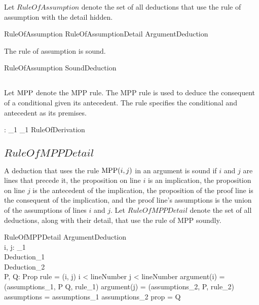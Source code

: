 \documentclass[11pt, oneside]{article}
\begin{document}
Let $RuleOfAssumption$ denote the set of all deductions that use the rule of assumption with the detail hidden.

\begin{zed}
	RuleOfAssumption  RuleOfAssumptionDetail \project ArgumentDeduction
\end{zed}

The rule of assumption is sound.

\begin{zed}
	RuleOfAssumption \subset SoundDeduction
\end{zed}

\subsection{}

Let $\operatorname{MPP}$ denote the MPP rule.
The MPP rule is used to deduce the consequent of a conditional given its antecedent.
The rule specifies the conditional and antecedent as its premises.

\begin{axdef}
	: \nat_1 \cross \nat_1 \fun RuleOfDerivation
\end{axdef}

\subsection{$RuleOfMPPDetail$}

A deduction that uses the rule $\operatorname{MPP}(i, j)$ in an argument is sound if $i$ and $j$ are lines
that precede it, the proposition on line $i$ is an implication, the proposition on line $j$ is the antecedent
of the implication, the proposition of the proof line is the consequent of the implication,
and the proof line's assumptions is the union of the assumptions of lines $i$ and $j$.
Let $RuleOfMPPDetail$ denote the set of all deductions, along with their detail, that use the rule of MPP soundly.

\begin{schema}{RuleOfMPPDetail}
	ArgumentDeduction \\
	i, j: \nat_1 \\
	Deduction_1 \\
	Deduction_2 \\
	P, Q: Prop
\where
	rule =  (i, j)
\also
	i < lineNumber \land j < lineNumber
\also
	argument(i) = (assumptions_1, P \impliesProp Q, rule_1)
\also
	argument(j) = (assumptions_2, P, rule_2)
\also
	assumptions = assumptions_1 \cup assumptions_2
\also
	prop = Q
\end{schema}
\end{document}
